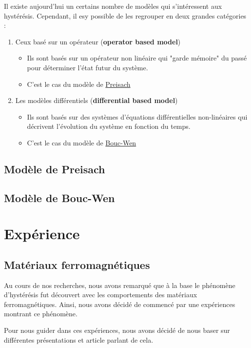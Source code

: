 \documentclass[11pt]{article}
\begin{document}
Il existe aujourd'hui un certains nombre de modèles qui s'intéressent aux hystérésis. Cependant, il esy possible
de les regrouper en deux grandes catégories :
\begin{enumerate}
    \item Ceux basé sur un opérateur (\textbf{operator based model})
    \begin{itemize}
        \item Ils sont basés sur un opérateur non linéaire qui "garde mémoire" du passé pour déterminer l'état futur du système.
        \item C'est le cas du modèle de \underline{Preisach}
    \end{itemize}
    \item Les modèles différentiels (\textbf{differential based model})
    \begin{itemize}
        \item Ils sont basés sur des systèmes d'équations différentielles non-linéaires qui décrivent l'évolution du système en fonction du temps.
        \item C'est le cas du modèle de \underline{Bouc-Wen}
    \end{itemize}
\end{enumerate}


\subsection{Modèle de Preisach}
\subsection{Modèle de Bouc-Wen}

\section{Expérience}
\subsection{Matériaux ferromagnétiques}

Au cours de nos recherches, nous avons remarqué que à la base le phénomène d'hystérésis fut découvert avec les
comportements des matériaux ferromagnétiques. Ainsi, nous avons décidé de commencé par une expériences montrant
ce phénomène.

Pour nous guider dans ces expériences, nous avons décidé de nous baser sur différentes présentations et article 
parlant de cela. \cite{nahouliEtudeRealisationDun} \cite{prepasphysiqueTPAgregationPhysique2024} 
\end{document}
